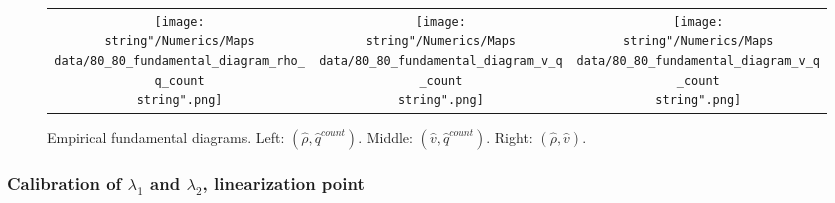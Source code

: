 \documentclass[preprint]{elsarticle}
\begin{document}
\begin{figure}[H]
\centering
\begin{tabular}{ccc}
\texttt{[image: \\string"/Numerics/Maps data/80\_80\_fundamental\_diagram\_rho\_q\_count\\string".png]} & \texttt{[image: \\string"/Numerics/Maps data/80\_80\_fundamental\_diagram\_v\_q\_count\\string".png]} & \texttt{[image: \\string"/Numerics/Maps data/80\_80\_fundamental\_diagram\_v\_q\_count\\string".png]}\tabularnewline
\end{tabular}
\protect\caption{Empirical fundamental diagrams. Left: $\left(\widehat{\rho},\widehat{q}^{count}\right)$.
Middle: $\left(\widehat{v},\widehat{q}^{count}\right)$. Right: $\left(\widehat{\rho},\widehat{v}\right)$.
\label{fig:Empirical-fundamental-diagrams}}
\end{figure}



\subsubsection{Calibration of $\lambda_{1}$ and $\lambda_{2}$, linearization point}
\end{document}
